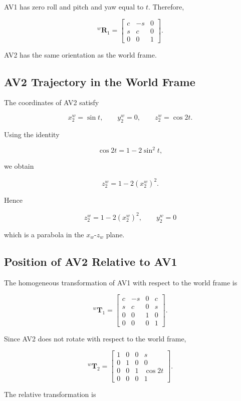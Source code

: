 \documentclass[11pt,a4paper]{article}
\begin{document}
AV1 has zero roll and pitch and yaw equal to $t$. Therefore,

\[
{}^{w}\bm{R}_1 =
\begin{bmatrix}
c & -s & 0\\
s & c & 0\\
0 & 0 & 1
\end{bmatrix}.
\]

AV2 has the same orientation as the world frame.

\subsection{AV2 Trajectory in the World Frame}

The coordinates of AV2 satisfy

\[
x_2^w = \sin t,
\qquad
y_2^w = 0,
\qquad
z_2^w = \cos 2t.
\]

Using the identity

\[
\cos 2t = 1 - 2\sin^2 t,
\]

we obtain

\[
z_2^w = 1 - 2(x_2^w)^2.
\]

Hence

\[
\boxed{
z_2^w = 1 - 2(x_2^w)^2,
\qquad
y_2^w = 0
}
\]

which is a parabola in the $x_w$-$z_w$ plane.

\subsection{Position of AV2 Relative to AV1}

The homogeneous transformation of AV1 with respect to the world frame is

\[
{}^{w}\bm{T}_1 =
\begin{bmatrix}
c & -s & 0 & c\\
s & c & 0 & s\\
0 & 0 & 1 & 0\\
0 & 0 & 0 & 1
\end{bmatrix}.
\]

Since AV2 does not rotate with respect to the world frame,

\[
{}^{w}\bm{T}_2 =
\begin{bmatrix}
1 & 0 & 0 & s\\
0 & 1 & 0 & 0\\
0 & 0 & 1 & \cos 2t\\
0 & 0 & 0 & 1
\end{bmatrix}.
\]

The relative transformation is
\end{document}
